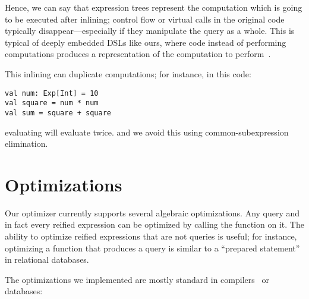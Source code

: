 Hence, we can say that expression trees represent the computation which is going to be executed
after inlining; control flow or virtual calls in the original code typically
disappear---especially if they manipulate the query as a whole.
This is typical of deeply embedded DSLs like ours, where code instead of performing
computations produces a representation of the computation to
perform~\citep{elliott03compiling, Chambers10}.

This inlining can duplicate computations; for instance, in this
code:
\begin{lstlisting}
val num: Exp[Int] = 10
val square = num * num
val sum = square + square
\end{lstlisting}
evaluating  will evaluate  twice.
\citet{elliott03compiling} and we avoid this using common-subexpression
elimination.

\section{Optimizations}

Our optimizer currently supports several algebraic optimizations.
Any query and in fact every reified expression can be optimized by calling the  function on it. The ability to optimize reified expressions that are not queries is
useful; for instance, optimizing a function that produces a query is similar to a ``prepared statement''
in relational databases.

The optimizations we implemented are mostly standard in compilers~\citep{DBLP:books/mk/Muchnick1997} or databases:

